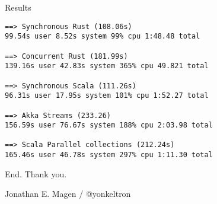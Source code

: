 \documentclass[aspectratio=169,14pt]{beamer}
\newcommand{\megatext}[1]{
  \begin{center}
    \Huge
    #1
  \end{center}
}
\begin{document}
\begin{frame}[fragile]{Results}
  \small
  \begin{verbatim}
==> Synchronous Rust (108.06s)
99.54s user 8.52s system 99% cpu 1:48.48 total

==> Concurrent Rust (181.99s)
139.16s user 42.83s system 365% cpu 49.821 total

==> Synchronous Scala (111.26s)
96.31s user 17.95s system 101% cpu 1:52.27 total

==> Akka Streams (233.26)
156.59s user 76.67s system 188% cpu 2:03.98 total

==> Scala Parallel collections (212.24s)
165.46s user 46.78s system 297% cpu 1:11.30 total
  \end{verbatim}
\end{frame}


\begin{frame}
  \megatext{End. Thank you.}
  \Large
  \centering
  Jonathan E. Magen /  @yonkeltron
\end{frame}
\end{document}
